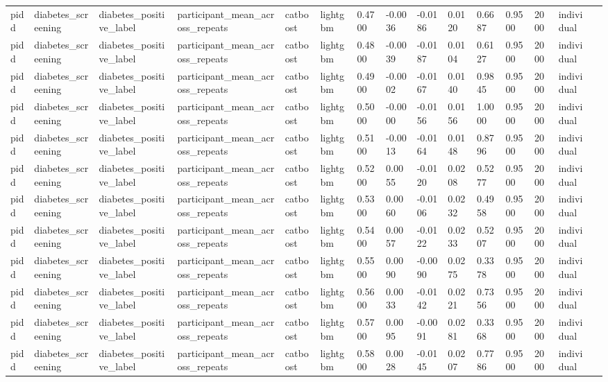 \begin{tabular}{lllllllllllllll}
pidd & diabetes\_screening & diabetes\_positive\_label & participant\_mean\_across\_repeats & catboost & lightgbm & 0.4700 & -0.0036 & -0.0186 & 0.0120 & 0.6687 & 0.9500 & 2000 & individual &  \\
pidd & diabetes\_screening & diabetes\_positive\_label & participant\_mean\_across\_repeats & catboost & lightgbm & 0.4800 & -0.0039 & -0.0187 & 0.0104 & 0.6127 & 0.9500 & 2000 & individual &  \\
pidd & diabetes\_screening & diabetes\_positive\_label & participant\_mean\_across\_repeats & catboost & lightgbm & 0.4900 & -0.0002 & -0.0167 & 0.0140 & 0.9845 & 0.9500 & 2000 & individual &  \\
pidd & diabetes\_screening & diabetes\_positive\_label & participant\_mean\_across\_repeats & catboost & lightgbm & 0.5000 & -0.0000 & -0.0156 & 0.0156 & 1.0000 & 0.9500 & 2000 & individual &  \\
pidd & diabetes\_screening & diabetes\_positive\_label & participant\_mean\_across\_repeats & catboost & lightgbm & 0.5100 & -0.0013 & -0.0164 & 0.0148 & 0.8796 & 0.9500 & 2000 & individual &  \\
pidd & diabetes\_screening & diabetes\_positive\_label & participant\_mean\_across\_repeats & catboost & lightgbm & 0.5200 & 0.0055 & -0.0120 & 0.0208 & 0.5277 & 0.9500 & 2000 & individual &  \\
pidd & diabetes\_screening & diabetes\_positive\_label & participant\_mean\_across\_repeats & catboost & lightgbm & 0.5300 & 0.0060 & -0.0106 & 0.0232 & 0.4958 & 0.9500 & 2000 & individual &  \\
pidd & diabetes\_screening & diabetes\_positive\_label & participant\_mean\_across\_repeats & catboost & lightgbm & 0.5400 & 0.0057 & -0.0122 & 0.0233 & 0.5207 & 0.9500 & 2000 & individual &  \\
pidd & diabetes\_screening & diabetes\_positive\_label & participant\_mean\_across\_repeats & catboost & lightgbm & 0.5500 & 0.0090 & -0.0090 & 0.0275 & 0.3378 & 0.9500 & 2000 & individual &  \\
pidd & diabetes\_screening & diabetes\_positive\_label & participant\_mean\_across\_repeats & catboost & lightgbm & 0.5600 & 0.0033 & -0.0142 & 0.0221 & 0.7356 & 0.9500 & 2000 & individual &  \\
pidd & diabetes\_screening & diabetes\_positive\_label & participant\_mean\_across\_repeats & catboost & lightgbm & 0.5700 & 0.0095 & -0.0091 & 0.0281 & 0.3368 & 0.9500 & 2000 & individual &  \\
pidd & diabetes\_screening & diabetes\_positive\_label & participant\_mean\_across\_repeats & catboost & lightgbm & 0.5800 & 0.0028 & -0.0145 & 0.0207 & 0.7786 & 0.9500 & 2000 & individual &  \\

\end{tabular}
